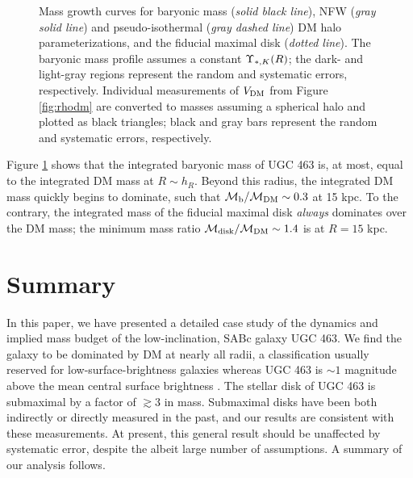 \documentclass[apj,iop,numberedappendix]{emulateapj}
\begin{document}
\begin{figure}
\caption{
%
Mass growth curves for baryonic mass ({\it solid black line}), NFW ({\it gray
solid line}) and pseudo-isothermal ({\it gray dashed line}) DM halo
parameterizations, and the fiducial maximal disk ({\it dotted line}).  The
baryonic mass profile assumes a constant $\Upsilon_{\ast,K}(R)$; the dark- and light-gray
regions represent the random and systematic errors, respectively.  Individual
measurements of $V_{\rm DM}$ from Figure \ref{fig:rhodm} are converted to masses
assuming a spherical halo and plotted as black triangles; black and gray bars
represent the random and systematic errors, respectively.
%
}
\label{fig:mass}
\end{figure}

Figure \ref{fig:mass} shows that the integrated baryonic mass of UGC 463 is, at
most, equal to the integrated DM mass at $R\sim h_R$.  Beyond this radius, the
integrated DM mass quickly begins to dominate, such that $\mathcal{M}_{\rm b}/\mathcal{M}_{\rm DM}\sim 0.3$ at
15 kpc.  To the contrary, the integrated mass of the fiducial maximal disk {\it
always} dominates over the DM mass; the minimum mass ratio $\mathcal{M}_{\rm disk}/\mathcal{M}_{\rm DM}\sim1.4$
is at $R=15$ kpc.

\section{Summary}
\label{sec:summary}

In this paper, we have presented a detailed case study of the dynamics and
implied mass budget of the low-inclination, SABc galaxy UGC 463.  We find the
galaxy to be dominated by DM at nearly all radii, a classification usually
reserved for low-surface-brightness galaxies whereas UGC 463 is $\sim1$
magnitude above the \citet{1970ApJ...160..811F} mean central surface brightness
.  The stellar disk of UGC 463 is submaximal by
a factor of $\gtrsim3$ in mass.  Submaximal disks have been both indirectly
\citep[e.g.][]{1999ApJ...513..561C} or directly \citep{1993A&A...275...16B,
2009ApJ...705.1686H} measured in the past, and our results are consistent with
these measurements.  At present, this general result should be unaffected by
systematic error, despite the albeit large number of assumptions.  A summary of
our analysis follows.
\end{document}
